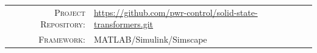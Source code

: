 \documentclass[12pt,a4paper]{scrartcl}
\newcommand{\MetaLabelA}{Project Repository}
\newcommand{\MetaValueA}{https://github.com/pwr-control/solid-state-transformers.git}
\newcommand{\MetaLabelB}{Framework}
\newcommand{\MetaValueB}{MATLAB/Simulink/Simscape}
\newcommand{\MetaLabelC}{Architecture}
\newcommand{\MetaValueC}{SiC, EiceDRIVER, Customized Power Supplies}
\begin{document}
	\vfill
	
	\noindent
	\begin{tabular}{@{} r @{\quad} l @{}}
		\textsc{\small\MetaLabelA:} & {\small\url{\MetaValueA}} \\[3pt]
		\textsc{\small\MetaLabelB:} & {\small\MetaValueB}       \\[3pt]
	\end{tabular}
	
	\newpage
	\setcounter{page}{1}
	\tableofcontents
	\listoffigures	
	\listoftables
	\newpage
	
\end{document}
